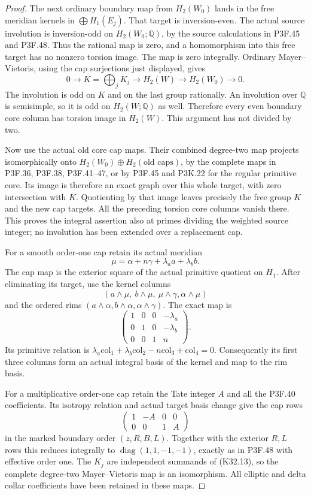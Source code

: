 \begin{proof}
The next ordinary boundary map from $H_2(W_0)$ lands
in the free meridian kernels in $\bigoplus H_1(E_j)$.
That target is inversion-even. The actual source
involution is inversion-odd on $H_2(W_0;\mathbb Q)$,
by the source calculations in P3F.45 and P3F.48.
Thus the rational map is zero, and a homomorphism into
this free target has no nonzero torsion image. The map
is zero integrally. Ordinary Mayer--Vietoris, using
the cap surjections just displayed, gives
\[
 0\longrightarrow K=\bigoplus_jK_j
  \longrightarrow H_2(W)
  \longrightarrow H_2(W_0)\longrightarrow0.             \tag{K32.13}
\]
The involution is odd on $K$ and on the last group
rationally. An involution over $\mathbb Q$ is semisimple,
so it is odd on $H_2(W;\mathbb Q)$ as well. Therefore
every even boundary core column has torsion image in
$H_2(W)$. This argument has not divided by two.

Now use the actual old core cap maps. Their combined
degree-two map projects isomorphically onto
$H_2(W_0)\oplus H_2(\text{old caps})$, by the complete
maps in P3F.36, P3F.38, P3F.41--47, or by P3F.45 and
P3K.22 for the regular primitive core. Its image is
therefore an exact graph over this whole target, with
zero intersection with $K$. Quotienting by that image
leaves precisely the free group $K$ and the new cap
targets. All the preceding torsion core columns vanish
there. This proves the integral assertion also at
primes dividing the weighted source integer; no
involution has been extended over a replacement cap.

For a smooth order-one cap retain its actual meridian
\[
          \mu=\alpha+n\gamma+\lambda_a a+\lambda_b b.
\]
The cap map is the exterior square of the actual
primitive quotient on $H_1$. After eliminating its
target, use the kernel columns
\[
 (a\wedge\mu,\ b\wedge\mu,\ \mu\wedge\gamma,
                                      \alpha\wedge\mu)
\]
and the ordered rims
$(a\wedge\alpha,b\wedge\alpha,\alpha\wedge\gamma)$.
The exact map is
\[
 \begin{pmatrix}
 1&0&0&-\lambda_a\\
 0&1&0&-\lambda_b\\
 0&0&1&n
 \end{pmatrix}.                                      \tag{K32.14}
\]
Its primitive relation is
$\lambda_a\mathrm{col}_1+\lambda_b\mathrm{col}_2
-n\mathrm{col}_3+\mathrm{col}_4=0$.
Consequently its first three columns form an actual
integral basis of the kernel and map to the rim basis.

For a multiplicative order-one cap retain the Tate
integer $A$ and all the P3F.40 coefficients. Its
isotropy relation and actual target basis change give
the cap rows
\[
                 \begin{pmatrix}1&-A&0&0\\0&0&1&A\end{pmatrix}
\]
in the marked boundary order $(z,R,B,L)$. Together
with the exterior $R,L$ rows this reduces integrally
to $\operatorname{diag}(1,1,-1,-1)$, exactly as in
P3F.48 with effective order one. The $K_j$ are
independent summands of (K32.13), so the complete
degree-two Mayer--Vietoris map is an isomorphism.
All elliptic and delta collar coefficients have been
retained in these maps.


\end{proof}
